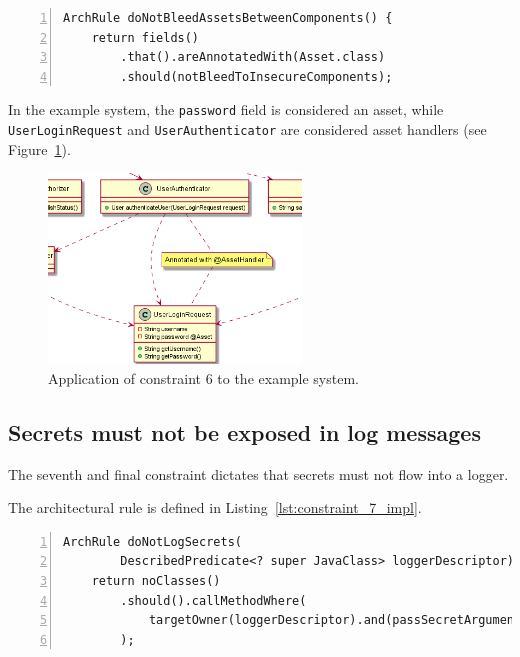 \begin{minipage}{\linewidth}
\begin{lstlisting}[caption={Rule definition for constraint 6.}, captionpos=b, label=lst:constraint_6_impl, numbers=left]
ArchRule doNotBleedAssetsBetweenComponents() {
    return fields()
        .that().areAnnotatedWith(Asset.class)
        .should(notBleedToInsecureComponents);
\end{lstlisting}
\end{minipage}

In the example system, the \texttt{password} field is considered an asset, while \texttt{UserLoginRequest} and \texttt{UserAuthenticator} are considered asset handlers (see Figure~\ref{fig:assets_toy_system}).

\begin{figure}[h]
    \centering
    \includegraphics[width=0.6\textwidth]{figure/toyexamples/Assets.png}
    \caption{Application of constraint 6 to the example system.}
    \label{fig:assets_toy_system}
\end{figure}

\subsection{Secrets must not be exposed in log messages}
The seventh and final constraint dictates that secrets must not flow into a logger. 

The architectural rule is defined in Listing~\ref{lst:constraint_7_impl}. 

\begin{minipage}{\linewidth}
\begin{lstlisting}[caption={Rule definition for constraint 7.}, captionpos=b, label=lst:constraint_7_impl, numbers=left]
ArchRule doNotLogSecrets(
        DescribedPredicate<? super JavaClass> loggerDescriptor) {
    return noClasses()
        .should().callMethodWhere(
            targetOwner(loggerDescriptor).and(passSecretArgument)
        );
\end{lstlisting}
\end{minipage}

